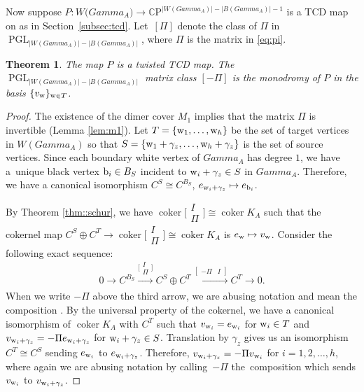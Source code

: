 \documentclass[10pt,a4paper]{amsart}
\numberwithin{equation}{section}
\newtheorem{Theorem}{Theorem}[section]
\newcommand{\C}{{\mathbb C}}
\newcommand{\CP}{{\mathbb C\mathrm P}}
\newcommand{\A}{{\mathbb A}}
\newcommand{\PGL}{\operatorname{PGL}}
\newcommand{\ra}{\rightarrow}
\newcommand{\la}{\label}
\newcommand{\w}{{\rm w}}
\newcommand{\bw}{{\rm b}}
\DeclareMathOperator{\coker}{coker}
\def\A{A}
\def\Gamma{Gamma}
\def\widehat#1{#1}
\def\C{C}
\begin{document}
	Now suppose $P\colon W\bigl(\Gamma_{\widehat \A}\bigr) \ra \CP^{|W(\Gamma_{\A})|-|B(\Gamma_{\A})|-1}$ is a TCD map on \smash{$\Gamma_{\widehat \A}$} as in Section~\ref{subsec:tcd}. Let~$[\Pi]$ denote the class of $\Pi$ in $\PGL_{|W(\Gamma_{\A})|-|B(\Gamma_{\A})|}$, where $\Pi$ is the matrix in \eqref{eq:pi}.
	\begin{Theorem} \la{prop:mon}
		The map $P$ is a twisted TCD map. The $\PGL_{|W(\Gamma_{\A})|-|B(\Gamma_{\A})|}$ matrix {class} $[-\Pi]$ is the monodromy of $P$ in the basis $\{v_\w\}_{\w \in T}$.
	\end{Theorem}
	\begin{proof}
		The existence of the dimer cover $M_1$ implies that the matrix $\Pi$ is invertible (Lemma \ref{lem:m1}). Let $T=\{{\rm w}_1,\dots,{\rm w}_h\}$ be the set of target vertices in $W(\Gamma_{\A})$ so that $S=\{{\rm w}_1+\gamma_z,\dots,{\rm w}_h+\gamma_z\}$ is the set of source vertices. Since each boundary white vertex of $\Gamma_\A$ has degree $1$, we have a~unique black vertex $\bw_i \in B_S$ incident to $\w_i+\gamma_z \in S$ in $\Gamma_\A$. Therefore, we have a canonical isomorphism $\C^{S} \cong \C^{B_S}$, $e_{\w_i+\gamma_z} \mapsto e_{{\mathrm b}_i}$.
		
		By Theorem \ref{thm::schur}, we have $\coker \bigl[\begin{smallmatrix}
			I\\
			\Pi
		\end{smallmatrix}\bigr] \cong \coker K_\A$ such that the cokernel map $\C^S \oplus \C^T \ra \coker \bigl[\begin{smallmatrix}
			I\\
			\Pi
		\end{smallmatrix}\bigr] \cong \coker K_\A$ is $e_\w \mapsto v_\w$. Consider the following exact sequence:
		\[
		0 \ra \C^{B_S} \xrightarrow[]{\bigl[\begin{smallmatrix}
				I\\
				\Pi
		\end{smallmatrix}\bigr]} \C^S \oplus \C^T \xrightarrow[]{[\begin{smallmatrix}
				-\Pi & I
		\end{smallmatrix}]} \C^T \ra 0.
		\]
		When we write $-\Pi$ above the third arrow, we are abusing notation and mean the composition \smash{$\C^S \cong \C^{B_S} \xrightarrow[]{-\Pi} \C^T$}. By the universal property of the cokernel, we have a canonical isomorphism of $\coker K_\A$ with $\C^T$ such that $v_{\w_i} = e_{\w_i} $ for $\w_i \in T$ and $v_{\w_i+\gamma_z} = -\Pi e_{\w_i+\gamma_z}$ for ${\w_i+\gamma_z \in S}$. Translation by $\gamma_z$ gives us an isomorphism $\C^T \cong \C^S$ sending $e_{\w_i}$ to $e_{\w_i + \gamma_z}$. Therefore, ${v_{{\rm w}_i+\gamma_z}=-\Pi{}v_{{\rm w}_i}}$ for $i=1,2,\dots,h$, where again we are abusing notation by calling~$-\Pi$ the~composition \smash{$\C^T \cong \C^S \xrightarrow[]{-\Pi} \C^T$} which sends $v_{\w _i}$ to $v_{\w_i + \gamma_z}$.
		

\end{proof}
\end{document}
